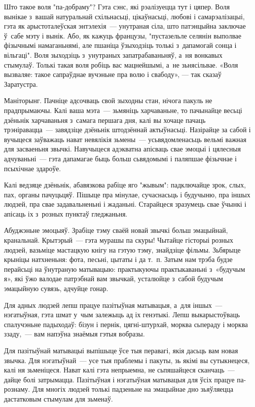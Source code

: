 Што такое воля "па-добраму"? Гэта сэнс, які рэалізуецца тут і цяпер. Воля вынікае з~вашай натуральнай схільнасьці, цікаўнасьці, любові і самарэалізацыі, гэта як арыстоталеўская энтэлехія~--- унутраная сіла, што патэнцыйна заключае ў~сабе мэту і вынік. Або, як кажуць французы, "пустазельле селянін выполвае фізычнымі намаганьнямі, але пшаніца ўзыходзіць толькі з~дапамогай сонца і вільгаці". Воля зыходзіць з~унутраных запатрабаваньняў, а~ня вонкавых стымулаў. Толькі такая воля робіць вас мацнейшымі, а~не зьнясільвае. «Воля вызваляе: такое сапраўднае вучэньне пра волю і свабоду», — так сказаў Заратустра.

Маніторынг. Пачніце адсочваць свой зыходны стан, нічога пакуль не прадпрымаючы. Калі ваша мэта~--- зьмяніць харчаваньне, то пачынайце весьці дзёньнік харчаваньня з~самага першага дня, калі вы хочаце пачаць трэніравацца~--- завядзіце дзёньнік штодзённай актыўнасьці. Назірайце за сабой і вучыцеся заўважаць нават невялікія зьмены~--- усьвядомленасьць вельмі важная для засваеньня звычкі. Навучыцеся адэкватна апісваць свае эмоцыі і цялесныя адчуваньні~--- гэта дапамагае быць больш сьвядомымі і паляпшае фізычнае і псыхічнае здароўе.

Калі ведзяце дзёньнік, абавязкова рабіце яго "жывым": падключайце зрок, слых, пах, органы пачуцьцяў. Пішыце пра мінулае, сучаснасьць і будучыню, пра іншых людзей, пра свае задавальненьні і жаданьні. Старайцеся зразумець свае ўчынкі і апісаць іх з~розных пунктаў гледжаньня.

Абуджэньне эмоцыяў. Зрабіце тэму сваёй новай звычкі больш эмацыйнай, кранальнай. Крытэрый~--- гэта мурашы па скуры! Чытайце гісторыі розных людзей, вазьміце мастацкую кнігу на гэтую тэму, знайдзіце фільмы. Зьбярыце крыніцы натхненьня: фота, песьні, цытаты і да т.~п. Затым нам трэба будзе перайсьці на ўнутраную матывацыю: практыкуючы практыкаваньні з~«будучым я», які ўжо валодае патрэбнай вам звычкай, усталюйце з~сабой будучым эмацыйную сувязь, адчуйце гонар.

Для адных людзей лепш працуе пазітыўная матывацыя, а~для іншых~--- нэгатыўная, гэта шмат у~чым залежыць ад іх генэтыкі. Лепш выкарыстоўваць спалучэньне падыходаў: бізун і пернік, цягні-штурхай, морква сьпераду і морква ззаду,~--- вам напэўна знаёмыя гэтыя вобразы.

Для пазітыўнай матывацыі выпішыце ўсе тыя перавагі, якія дасьць вам новая звычка. Для нэгатыўнай~--- усе тыя праблемы і пакуты, зь якімі вы сутыкнецеся, калі ня зьменіцеся. Нават калі гэта непрыемна, не сьпяшайцеся сканчаць~--- дайце болі затрымацца. Пазітыўная і нэгатыўная матывацыя для ўсіх працуе па-рознаму. Для многіх людзей толькі падзеньне на эмацыйнае дно зьяўляецца дастатковым стымулам для зьменаў.

